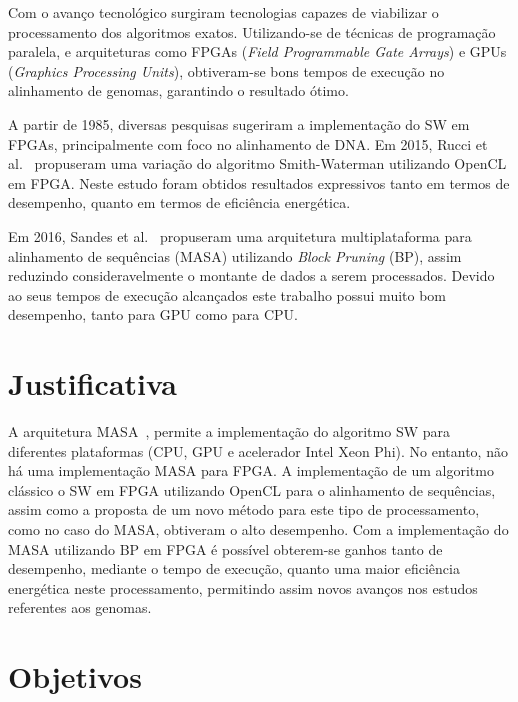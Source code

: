 \documentclass[12pt, a4paper]{article}
\numberwithin{table}{section}
\begin{document}
Com o avanço tecnológico surgiram tecnologias capazes de viabilizar o processamento
dos algoritmos exatos. Utilizando-se de técnicas de programação paralela, e 
arquiteturas como FPGAs (\textit{Field Programmable Gate Arrays}) e GPUs 
(\textit{Graphics Processing Units}), obtiveram-se bons tempos de execução no alinhamento
de genomas, garantindo o resultado ótimo. 

A partir de 1985, diversas pesquisas sugeriram a implementação do SW em FPGAs,
principalmente com foco no alinhamento de DNA. 
Em 2015, Rucci et al.~\cite{7345650} propuseram uma variação do algoritmo
Smith-Waterman utilizando OpenCL em FPGA.
Neste estudo foram obtidos resultados expressivos tanto em termos de desempenho, 
quanto em termos de eficiência energética. 

Em 2016, Sandes et al.~\cite{DeO.Sandes:2016:MMA:2888415.2858656} propuseram
uma arquitetura multiplataforma para
alinhamento de sequências (MASA) utilizando \textit{Block Pruning} (BP),
assim reduzindo consideravelmente o montante de dados a serem processados. 
Devido ao seus tempos de execução alcançados este trabalho possui muito bom
desempenho, tanto para GPU como para CPU.

\section{Justificativa}
\label{sec:justificativa}

A arquitetura MASA~\cite{DeO.Sandes:2016:MMA:2888415.2858656}, permite a 
implementação do algoritmo SW para diferentes plataformas (CPU, GPU e acelerador 
Intel Xeon Phi). No entanto, não há uma implementação MASA para FPGA.
A implementação de um algoritmo clássico o SW em FPGA utilizando OpenCL para o 
alinhamento de sequências, assim como a proposta de um novo método para este
tipo de processamento, como no caso do MASA, obtiveram o alto desempenho. 
Com a implementação do MASA utilizando BP em FPGA é possível obterem-se ganhos tanto 
de desempenho, mediante o tempo de execução, quanto uma maior eficiência energética
neste processamento, permitindo assim novos avanços nos estudos referentes aos genomas.


\section{Objetivos}
\label{sec:objetivos}
\end{document}

